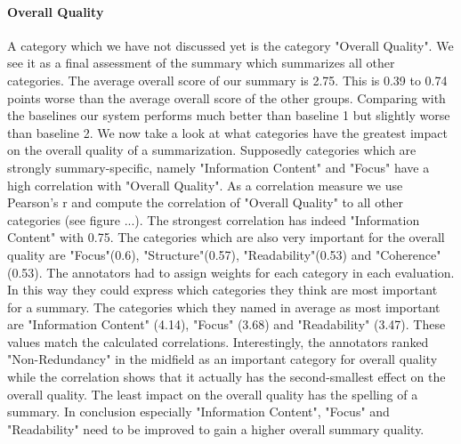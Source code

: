 \paragraph{Overall Quality}
A category which we have not discussed yet is the category "Overall Quality". We see it as a final assessment of the summary which summarizes all other categories. The average overall score of our summary is 2.75. This is 0.39 to 0.74 points worse than the average overall score of the other groups. Comparing with the baselines our system performs much better than baseline 1 but slightly worse than baseline 2. We now take a look at what categories have the greatest impact on the overall quality of a summarization. Supposedly categories which are strongly summary-specific, namely "Information Content" and "Focus" have a high correlation with "Overall Quality". As a correlation measure we use Pearson's r and compute the correlation of "Overall Quality" to all other categories (see figure ...). The strongest correlation has indeed "Information Content" with 0.75. The categories which are also very important for the overall quality are "Focus"(0.6), "Structure"(0.57), "Readability"(0.53) and "Coherence"(0.53). The annotators had to assign weights for each category in each evaluation. In this way they could express which categories they think are most important for a summary. The categories which they named in average as most important are "Information Content" (4.14), "Focus" (3.68) and "Readability" (3.47). These values match the calculated correlations. Interestingly, the annotators ranked "Non-Redundancy" in the midfield as an important category for overall quality while the correlation shows that it actually has the second-smallest effect on the overall quality. The least impact on the overall quality has the spelling of a summary. In conclusion especially "Information Content", "Focus" and "Readability" need to be improved to gain a higher overall summary quality.